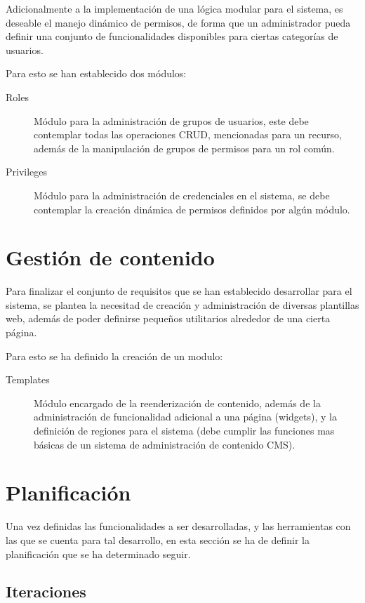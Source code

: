 Adicionalmente a la implementación de una lógica modular para el sistema, es
deseable el manejo dinámico de permisos, de forma que un administrador pueda
definir una conjunto de funcionalidades disponibles para ciertas categorías de
usuarios.

Para esto se han establecido dos módulos:

\begin{description}
\item [Roles] Módulo para la administración de grupos de usuarios, este debe
contemplar todas las operaciones CRUD, mencionadas para un recurso, además de la
manipulación de grupos de permisos para un rol común.
\item [Privileges] Módulo para la administración de credenciales en el sistema,
se debe contemplar la creación dinámica de permisos definidos por algún módulo.
\end{description}

\section{Gestión de contenido}

Para finalizar el conjunto de requisitos que se han establecido desarrollar
para el sistema, se plantea la necesitad de creación y administración de
diversas plantillas web, además de poder definirse pequeños utilitarios
alrededor de una cierta página.

Para esto se ha definido la creación de un modulo:

\begin{description}
\item [Templates] Módulo encargado de la reenderización de contenido, además de
la administración de funcionalidad adicional a una página (widgets), y la
definición de regiones para el sistema (debe cumplir las funciones mas básicas
de un sistema de administración de contenido CMS).
\end{description}

\section{Planificación}

Una vez definidas las funcionalidades a ser desarrolladas, y las herramientas
con las que se cuenta para tal desarrollo, en esta sección se ha de definir la
planificación que se ha determinado seguir.

\subsection{Iteraciones}

